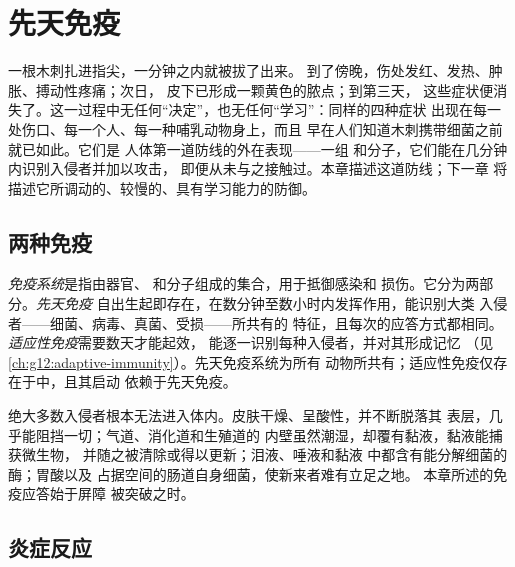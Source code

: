 \chapter{先天免疫}\label{ch:g12:innate-immunity}

一根木刺扎进指尖，一分钟之内就被拔了出来。
到了傍晚，伤处发红、发热、肿胀、搏动性疼痛；次日，
皮下已形成一颗黄色的脓点；到第三天，
这些症状便消失了。这一过程中无任何“决定”，也无任何“学习”：同样的四种症状
出现在每一处伤口、每一个人、每一种哺乳动物身上，而且
早在人们知道木刺携带细菌之前就已如此。它们是
人体第一道防线的外在表现——一组
和分子，它们能在几分钟内识别入侵者并加以攻击，
即便从未与之接触过。本章描述这道防线；下一章
将描述它所调动的、较慢的、具有学习能力的防御。

\section{两种免疫}

\begin{definition}[先天免疫与适应性免疫]\label{def:g12:innate-immunity:immunity}
\emph{免疫系统}是指由器官、
和分子组成的集合，用于抵御感染和
损伤。它分为两部分。\emph{先天免疫}
自出生起即存在，在数分钟至数小时内发挥作用，能识别大类
入侵者——细菌、病毒、真菌、受损——所共有的
特征，且每次的应答方式都相同。
\emph{适应性免疫}需要数天才能起效，
能逐一识别每种入侵者，并对其形成记忆
（见\cref{ch:g12:adaptive-immunity}）。先天免疫系统为所有
动物所共有；适应性免疫仅存在于中，且其启动
依赖于先天免疫。
\end{definition}

\begin{proposition}[屏障优先]\label{prop:g12:innate-immunity:barriers}
绝大多数入侵者根本无法进入体内。皮肤干燥、呈酸性，并不断脱落其
表层，几乎能阻挡一切；气道、消化道和生殖道的
内壁虽然潮湿，却覆有黏液，黏液能捕获微生物，
并随之被清除或得以更新；泪液、唾液和黏液
中都含有能分解细菌的酶；胃酸以及
占据空间的肠道自身细菌，使新来者难有立足之地。
本章所述的免疫应答始于屏障
被突破之时。
\end{proposition}
\admitted

\section{炎症反应}

